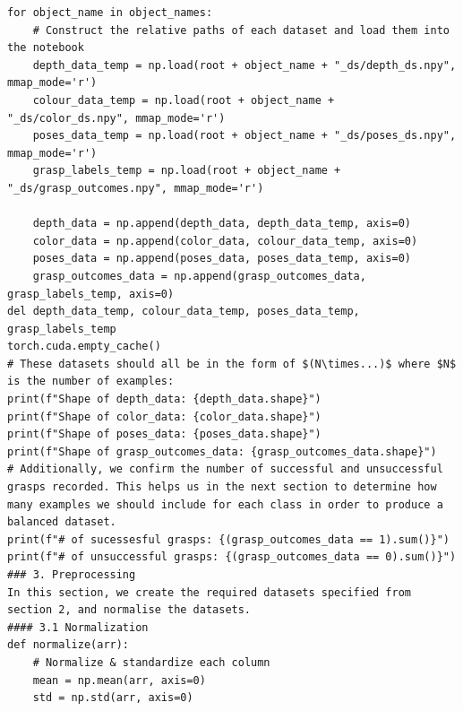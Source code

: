 \documentclass[11pt, a4paper]{report}
\begin{document}
\begin{lstlisting}
for object_name in object_names:
    # Construct the relative paths of each dataset and load them into the notebook
    depth_data_temp = np.load(root + object_name + "_ds/depth_ds.npy", mmap_mode='r')
    colour_data_temp = np.load(root + object_name + "_ds/color_ds.npy", mmap_mode='r')
    poses_data_temp = np.load(root + object_name + "_ds/poses_ds.npy", mmap_mode='r')
    grasp_labels_temp = np.load(root + object_name + "_ds/grasp_outcomes.npy", mmap_mode='r')

    depth_data = np.append(depth_data, depth_data_temp, axis=0)
    color_data = np.append(color_data, colour_data_temp, axis=0)
    poses_data = np.append(poses_data, poses_data_temp, axis=0)
    grasp_outcomes_data = np.append(grasp_outcomes_data, grasp_labels_temp, axis=0)
del depth_data_temp, colour_data_temp, poses_data_temp, grasp_labels_temp
torch.cuda.empty_cache()
# These datasets should all be in the form of $(N\times...)$ where $N$ is the number of examples:
print(f"Shape of depth_data: {depth_data.shape}")
print(f"Shape of color_data: {color_data.shape}")
print(f"Shape of poses_data: {poses_data.shape}")
print(f"Shape of grasp_outcomes_data: {grasp_outcomes_data.shape}")
# Additionally, we confirm the number of successful and unsuccessful grasps recorded. This helps us in the next section to determine how many examples we should include for each class in order to produce a balanced dataset.
print(f"# of sucessesful grasps: {(grasp_outcomes_data == 1).sum()}")
print(f"# of unsuccessful grasps: {(grasp_outcomes_data == 0).sum()}")
### 3. Preprocessing
In this section, we create the required datasets specified from section 2, and normalise the datasets.
#### 3.1 Normalization
def normalize(arr):
    # Normalize & standardize each column
    mean = np.mean(arr, axis=0)
    std = np.std(arr, axis=0)
    

\end{lstlisting}
\end{document}
